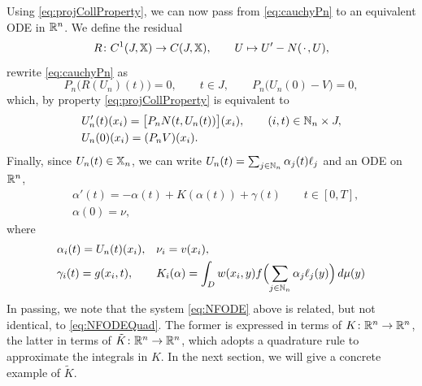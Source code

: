 \documentclass[a4paper]{siamart190516}
\begin{document}
Using \cref{eq:projCollProperty}, we can now pass from \cref{eq:cauchyPn} to an
equivalent ODE in $\mathbb{R}^n$. We define the residual
\[
  R \colon C^1(J,\mathbb{X}) \to C(J,\mathbb{X}), \qquad U \mapsto U' - N({\mkern 2mu\cdot\mkern 2mu}, U),
\]
rewrite \cref{eq:cauchyPn} as
\[
  P_n \bigl( R(U_n)(t) \bigr) = 0, \qquad t \in J, \qquad 
  P_n \bigl( U_n(0) - V\bigr) = 0, 
\]
which, by property \cref{eq:projCollProperty} is equivalent to
\[
  \begin{aligned}
  & U'_n(t)(x_i) = \bigl[P_n N(t,U_n(t))\bigr](x_i), \qquad (i,t) \in \mathbb{N}_n \times J, \\
  & U_n(0)(x_i) = (P_n V)(x_i).
  \end{aligned}
\]
Finally, since $U_n(t) \in \mathbb{X}_n$, we can write $U_n(t) = \sum_{j \in \mathbb{N}_n}
\alpha_j(t) \ell_j$ and an ODE on $\mathbb{R}^n$,
\begin{equation} \label{eq:NFODE}
  \begin{aligned}
   & \alpha'(t) = -\alpha(t) + K(\alpha(t)) + \gamma(t) \qquad  t \in [0,T],\\ 
   & \alpha (0) = \nu,
  \end{aligned}
\end{equation}  
where 
\[
  \begin{aligned}
  & \alpha_i(t) = U_n(t)(x_i), && \nu_i = v(x_i),  \\
  & \gamma_i(t) = g(x_i,t),
  && K_i(\alpha) = 
    \int_{D}w(x_i,y) f\Bigl( \sum_{j \in \mathbb{N}_n} \alpha_j \ell_j(y)\Bigr) \, d\mu(y)
  \end{aligned}
\]
In passing, we note that the system \cref{eq:NFODE} above is related, but not
identical, to \cref{eq:NFODEQuad}. The former is expressed in terms of 
$K \colon \mathbb{R}^n \to \mathbb{R}^n$, the latter in terms of
$\tilde K \colon \mathbb{R}^n \to \mathbb{R}^n$, which adopts a quadrature rule to approximate
the integrals in $K$. In the next section, we will give a concrete example of $\tilde
K$.
\end{document}
